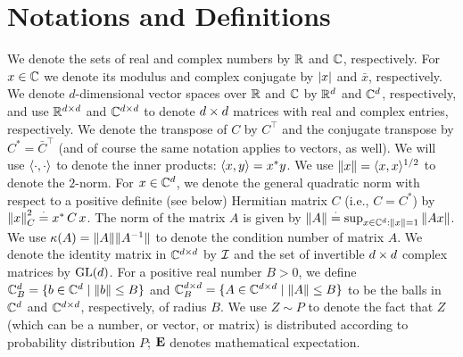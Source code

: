 \section{Notations and Definitions}\label{sec:def}
We denote the sets of real and complex numbers by $\mathbb{R}$ and $\mathbb{C}$, respectively. For $x\in \mathbb{C}$ we denote its modulus and complex conjugate by $\left|x\right|$ and $\bar{x}$, respectively. We denote $d$-dimensional vector spaces over $\mathbb{R}$ and $\mathbb{C}$ by $\mathbb{R}^{d}$ and $\mathbb{C}^{d}$, respectively, and use $\mathbb{R}^{d \times d}$ and $\mathbb{C}^{d \times d}$ to denote $d \times d$ matrices with real and complex entries, respectively. We denote the transpose of $C$ by $C^\top$ and the conjugate transpose by $C^*={\bar{C}}^\top$ (and of course the same notation applies to vectors, as well). We will use $\langle\cdot,\cdot\rangle$ to denote the inner products: $\langle x,y\rangle=x^* y$. 
We use $\left\| x\right\| = \langle x,x\rangle^{1/2}$ to denote the $2$-norm.
For $x\in\mathbb{C}^d$, we denote the general quadratic norm with respect to a positive definite (see below) Hermitian matrix $C$ (i.e., $C=C^*$) by $\left\| x\right\|^2_C\stackrel{\cdot}{=} x^*\, C \,x$.
The norm of the matrix $A$ is given by $\left\| A\right\|\stackrel{\cdot}{=} \sup_{x\in \mathbb{C}^d:\left\| x\right\|=1} \left\| Ax\right\|$.  We use $\kappa(A)=\| A\|\| A^{-1}\|$ to denote the condition number of matrix $A$. We denote the identity matrix in $\mathbb{C}^{d \times d}$ by $\mathcal{I}$ and the set of invertible $d \times d$ complex matrices by $\mathrm{GL}(d)$.
For a positive real number $B>0$, we define $\mathbb{C}^{d}_B=\{b\in \mathbb{C}^d\mid \left\| b\right\|\leq B\}$ and $\mathbb{C}^{d \times d}_B=\{A\in \mathbb{C}^{d \times d}\mid \left\| A\right\|\leq B\}$ to be the balls in $\mathbb{C}^d$ and $\mathbb{C}^{d\times d}$, respectively, of radius $B$.
We use $Z\sim P$ to denote the fact that $Z$ (which can be a number, or vector, or matrix) is distributed according to probability distribution $P$;
$\mathbf{E}$ denotes mathematical expectation.

